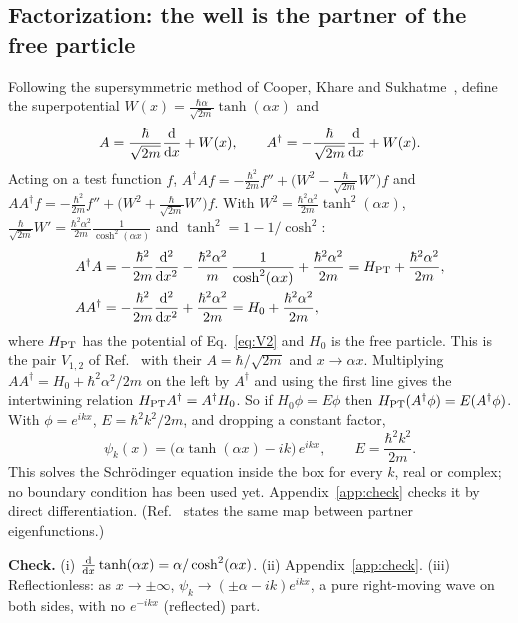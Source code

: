 \documentclass[11pt]{article}
\numberwithin{equation}{section}
\begin{document}
\subsection{Factorization: the well is the partner of the free particle}
Following the supersymmetric method of Cooper, Khare and Sukhatme~\cite[pp.~13--14, Eqs.~(3)--(11)]{CKS}, define the superpotential $W(x)=\frac{\hbar\alpha}{\sqrt{2m}}\tanh(\alpha x)$ and
\begin{equation}
A=\frac{\hbar}{\sqrt{2m}}\dv{x}+W(x),\qquad A^\dagger=-\frac{\hbar}{\sqrt{2m}}\dv{x}+W(x).
\end{equation}
Acting on a test function $f$, $A^\dagger Af=-\frac{\hbar^2}{2m}f''+\big(W^2-\frac{\hbar}{\sqrt{2m}}W'\big)f$ and $AA^\dagger f=-\frac{\hbar^2}{2m}f''+\big(W^2+\frac{\hbar}{\sqrt{2m}}W'\big)f$. With $W^2=\frac{\hbar^2\alpha^2}{2m}\tanh^2(\alpha x)$, $\frac{\hbar}{\sqrt{2m}}W'=\frac{\hbar^2\alpha^2}{2m}\frac{1}{\cosh^2(\alpha x)}$ and $\tanh^2=1-1/\cosh^2$:
\begin{align}
A^\dagger A&=-\frac{\hbar^2}{2m}\dv[2]{x}-\frac{\hbar^2\alpha^2}{m}\,\frac{1}{\cosh^2(\alpha x)}+\frac{\hbar^2\alpha^2}{2m}=H_{\rm PT}+\frac{\hbar^2\alpha^2}{2m},\\
AA^\dagger&=-\frac{\hbar^2}{2m}\dv[2]{x}+\frac{\hbar^2\alpha^2}{2m}=H_{0}+\frac{\hbar^2\alpha^2}{2m},
\end{align}
where $H_{\rm PT}$ has the potential of Eq.~\eqref{eq:V2} and $H_0$ is the free particle. This is the pair $V_{1,2}$ of Ref.~\cite[p.~18, Eqs.~(32)--(33)]{CKS} with their $A=\hbar/\sqrt{2m}$ and $x\to\alpha x$. Multiplying $AA^\dagger=H_0+\hbar^2\alpha^2/2m$ on the left by $A^\dagger$ and using the first line gives the intertwining relation $H_{\rm PT}A^\dagger=A^\dagger H_0$. So if $H_0\phi=E\phi$ then $H_{\rm PT}(A^\dagger\phi)=E(A^\dagger\phi)$. With $\phi=e^{ikx}$, $E=\hbar^2k^2/2m$, and dropping a constant factor,
\begin{equation}
\boxed{\;\psi_k(x)=\big(\alpha\tanh(\alpha x)-ik\big)\,e^{ikx},\qquad E=\frac{\hbar^2k^2}{2m}.\;}
\label{eq:jost}
\end{equation}
This solves the Schr\"odinger equation inside the box for every $k$, real or complex; no boundary condition has been used yet. Appendix~\ref{app:check} checks it by direct differentiation. (Ref.~\cite[p.~14, Eqs.~(8)--(11)]{CKS} states the same map between partner eigenfunctions.)

\begin{checkbox}
\textbf{Check.} (i) $\dv{x}\tanh(\alpha x)=\alpha/\cosh^2(\alpha x)$. (ii) Appendix~\ref{app:check}. (iii) Reflectionless: as $x\to\pm\infty$, $\psi_k\to(\pm\alpha-ik)e^{ikx}$, a pure right-moving wave on both sides, with no $e^{-ikx}$ (reflected) part.
\end{checkbox}
\end{document}
